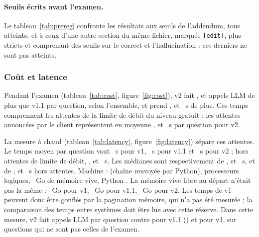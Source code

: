 \paragraph{Seuils écrits avant l'examen.} Le tableau~\ref{tab:prereg} confronte les résultats aux seuils de l'addendum, tous
atteints, et à ceux d'une autre section du même fichier, marquée \texttt{[edit]}, plus stricts et comprenant des seuils sur le
correct et l'hallucination : ces derniers ne sont pas atteints.



\subsubsection{Coût et latence}
Pendant l'examen (tableau~\ref{tab:cost}, figure~\ref{fig:cost}), v2 fait \EvDiffSoneVtwoVoneoneCalls, \EvDiffStwoVtwoVoneoneCalls{}
et \EvDiffSnoisyVtwoVoneoneCalls{} appels LLM de plus que v1.1 par question, selon l'ensemble, et prend \EvDiffSoneVtwoVoneoneSeconds,
\EvDiffStwoVtwoVoneoneSeconds{} et \EvDiffSnoisyVtwoVoneoneSeconds{}~s de plus. Ces temps comprennent les attentes de la limite
de débit du niveau gratuit : les attentes annoncées par le client représentent en moyenne \EvSoneVtwoWaits, \EvStwoVtwoWaits{} et
\EvSnoisyVtwoWaits~s par question pour v2.

La mesure à chaud (tableau~\ref{tab:latency}, figure~\ref{fig:latency}) sépare ces attentes. Le temps moyen par question vaut
\EvLatVoneWallMean~s pour v1, \EvLatVoneoneWallMean~s pour v1.1 et \EvLatVtwoWallMean~s pour v2 ; hors attentes de limite de débit,
\EvLatVoneExclMean, \EvLatVoneoneExclMean{} et \EvLatVtwoExclMean~s. Les médianes sont respectivement de \EvLatVoneWallMedian,
\EvLatVoneoneWallMedian{} et \EvLatVtwoWallMedian~s, et de \EvLatVoneExclMedian, \EvLatVoneoneExclMedian{} et \EvLatVtwoExclMedian~s
hors attentes. Machine : \EvLatOs{} (chaîne renvoyée par Python), \EvLatCpus{} processeurs logiques, \EvLatRamTotal~Go de mémoire vive, Python \EvLatPython. La mémoire
vive libre au départ n'était pas la même : \EvLatVoneRamAvail~Go pour v1, \EvLatVoneoneRamAvail~Go pour v1.1, \EvLatVtwoRamAvail~Go pour v2. Les
temps de v1 peuvent donc être gonflés par la pagination mémoire, qui n'a pas été mesurée ; la comparaison des temps entre systèmes
doit être lue avec cette réserve. Dans cette mesure, v2 fait \EvLatVtwoCalls{} appels LLM par question contre \EvLatVoneoneCalls{} pour v1.1
(\EvLatCallsDiff) et \EvLatVoneCalls{} pour v1, sur \EvLatQuestions{} questions qui ne sont pas celles de l'examen.

